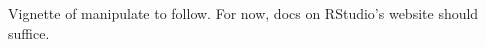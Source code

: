 \documentclass{article}
\begin{document}
Vignette of manipulate to follow. For now, docs on RStudio's website should suffice.
\end{document}
